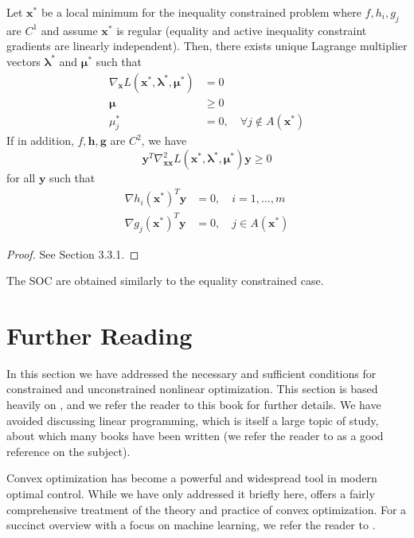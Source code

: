 \begin{theorem}
Let $\bm{x}^*$ be a local minimum for the inequality constrained problem where $f, h_i, g_j$ are $C^1$ and assume $\bm{x}^*$ is regular (equality and active inequality constraint gradients are linearly independent). Then, there exists unique Lagrange multiplier vectors $\bm{\lambda}^*$ and $\bm{\mu}^*$ such that
\begin{align}
    \nabla_{\bm{x}} L(\bm{x}^*,\bm{\lambda}^*, \bm{\mu}^*) &= 0\\
    \bm{\mu} &\geq 0\\
    \mu_j^* &= 0, \quad \forall j \notin A(\bm{x}^*)
\end{align}
If in addition, $f,\bm{h},\bm{g}$ are $C^2$, we have 
\begin{equation}
    \bm{y}^T \nabla^2_{\bm{xx}} L(\bm{x}^*,\bm{\lambda}^*, \bm{\mu}^*) \bm{y} \geq 0 
\end{equation}
for all $\bm{y}$ such that 
\begin{align}
    \nabla h_i(\bm{x}^*)^T \bm{y} &=0, \quad i = 1, \ldots, m\\
    \nabla g_j(\bm{x}^*)^T \bm{y} &=0, \quad j \in A(\bm{x}^*)
\end{align}
\end{theorem}

\begin{proof}
See \cite{bertsekas2016nonlinear} Section 3.3.1.
\end{proof}

The SOC are obtained similarly to the equality constrained case. 



\section{Further Reading}

In this section we have addressed the necessary and sufficient conditions for constrained and unconstrained nonlinear optimization. This section is based heavily on \cite{bertsekas2016nonlinear}, and we refer the reader to this book for further details. We have avoided discussing linear programming, which is itself a large topic of study, about which many books have been written (we refer the reader to \cite{bertsimas1997introduction} as a good reference on the subject). 

Convex optimization has become a powerful and widespread tool in modern optimal control. While we have only addressed it briefly here, \cite{boyd2004convex} offers a fairly comprehensive treatment of the theory and practice of convex optimization. For a succinct overview with a focus on machine learning, we refer the reader to \cite{kolter2008convex}.

